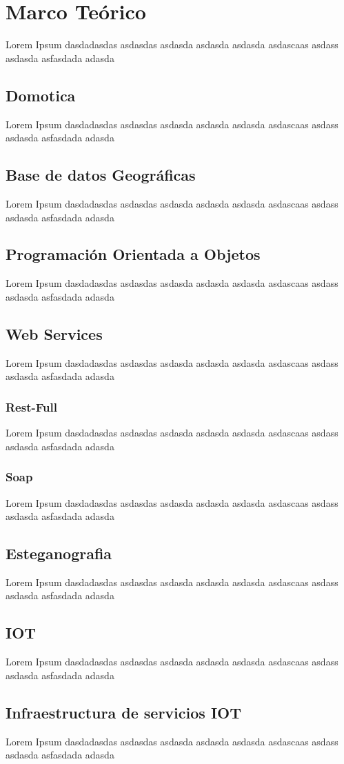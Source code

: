 \section{Marco Teórico}
Lorem Ipsum dasdadasdas asdasdas asdasda asdasda asdasda asdascaas asdass asdasda asfasdada adasda
\subsection{Domotica}
Lorem Ipsum dasdadasdas asdasdas asdasda asdasda asdasda asdascaas asdass asdasda asfasdada adasda
\subsection{Base de datos Geográficas}
Lorem Ipsum dasdadasdas asdasdas asdasda asdasda asdasda asdascaas asdass asdasda asfasdada adasda
\subsection{Programación Orientada a Objetos}
Lorem Ipsum dasdadasdas asdasdas asdasda asdasda asdasda asdascaas asdass asdasda asfasdada adasda
\subsection{Web Services}
Lorem Ipsum dasdadasdas asdasdas asdasda asdasda asdasda asdascaas asdass asdasda asfasdada adasda
\subsubsection{Rest-Full}
Lorem Ipsum dasdadasdas asdasdas asdasda asdasda asdasda asdascaas asdass asdasda asfasdada adasda
\subsubsection{Soap}
Lorem Ipsum dasdadasdas asdasdas asdasda asdasda asdasda asdascaas asdass asdasda asfasdada adasda
\subsection{Esteganografia}
Lorem Ipsum dasdadasdas asdasdas asdasda asdasda asdasda asdascaas asdass asdasda asfasdada adasda
\subsection{IOT}
Lorem Ipsum dasdadasdas asdasdas asdasda asdasda asdasda asdascaas asdass asdasda asfasdada adasda
\subsection{Infraestructura de servicios IOT}
Lorem Ipsum dasdadasdas asdasdas asdasda asdasda asdasda asdascaas asdass asdasda asfasdada adasda
